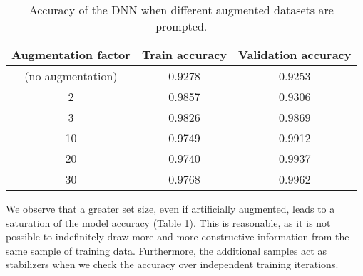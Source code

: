\begin{table}[h]
\begin{tabular}{ccc}
\hline\hline
Augmentation factor & Train accuracy & Validation accuracy \\ \hline
(no augmentation)   & 0.9278         & 0.9253              \\
2                   & 0.9857         & 0.9306              \\
3                   & 0.9826         & 0.9869              \\
10                  & 0.9749         & 0.9912              \\ 
20                  & 0.9740         & 0.9937              \\ %
30                  & 0.9768         & 0.9962              \\ \hline\hline
\end{tabular}
\caption{\label{tab:augmentation_accuracy}Accuracy of the DNN when different augmented datasets are prompted.} %
\end{table}

We observe that a greater set size, even if artificially augmented, leads to a saturation of the model accuracy (Table \ref{tab:augmentation_accuracy}). This is reasonable, as it is not possible to indefinitely draw more and more constructive information from the same sample of training data. Furthermore, the additional samples act as stabilizers when we check the accuracy over independent training iterations.